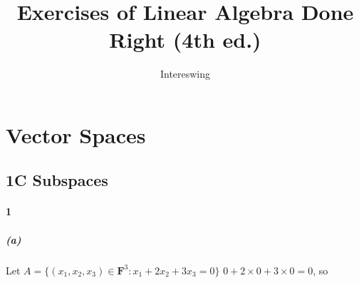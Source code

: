 \documentclass{article}
\title{Exercises of Linear Algebra Done Right (4th ed.)}
\author{Intereswing}
\begin{document}
\maketitle
\section{Vector Spaces}

\subsection{1C Subspaces}

\paragraph{1}
\subparagraph{(a)}
Let $A = \{(x_1,x_2,x_3) \in \mathbf{F}^3: x_1 + 2x_2 + 3x_3 = 0\}$
$0+2\times 0 + 3\times 0 = 0$, so 
\end{document}
